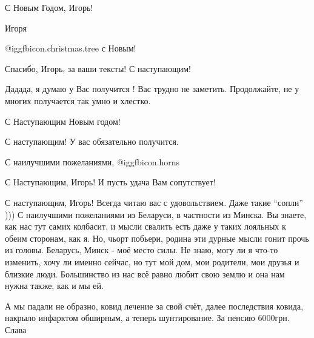  
 
 
 
 
\zzSecCmt

\begin{itemize} %
С Новым Годом, Игорь!

Игоря

 @igg{fbicon.christmas.tree}  с Новым!


Спасибо, Игорь, за ваши тексты! С наступающим!


Дадада, я думаю у Вас получится ! Вас трудно не заметить. Продолжайте, не у
многих получается так умно и хлестко.


С Наступающим Новым годом!


С наступающим! У вас обязательно получится.


С наилучшими пожеланиями, @igg{fbicon.horns} 


С Наступающим, Игорь! И пусть удача Вам сопутствует!


С наступающим, Игорь! Всегда читаю вас с удовольствием. Даже такие \enquote{сопли} )))
С наилучшими пожеланиями из Беларуси, в частности из Минска. Вы знаете, как нас
тут самих колбасит, и мысли свалить есть даже у таких лояльных к обеим
сторонам, как я. Но, чьорт побьери, родина эти дурные мысли гонит прочь из
головы. Беларусь, Минск - моё место силы. Не знаю, могу ли я что-то изменить,
хочу ли именно сейчас, но тут мой дом, мои родители, мои друзья и близкие люди.
Большинство из нас всё равно любит свою землю и она нам нужна также, как и мы
ей.


А мы падали не образно, ковид лечение за свой счёт, далее последствия ковида,
накрыло инфарктом обширным, а теперь шунтирование. За пенсию 6000грн. Слава



\end{itemize}
